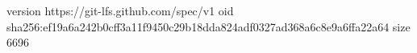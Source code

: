 version https://git-lfs.github.com/spec/v1
oid sha256:ef19a6a242b0cff3a11f9450c29b18dda824adf0327ad368a6c8e9a6ffa22a64
size 6696
